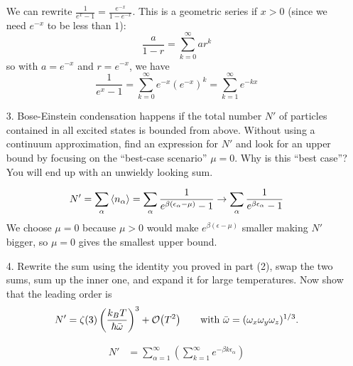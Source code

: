 \documentclass[a4paper,twoside]{article}
\begin{document}
\begin{itemize}
        \begin{problem}
            We can rewrite $ \frac{1}{e^x - 1} = \frac{e^{- x}}{1 - e^{- x}} $. This is a geometric series if $ x > 0 $ (since we need $ e^{- x} $ to be less than $ 1 $):
            \begin{equation}
                \frac{a}{1 - r} = \sum_{k=0}^{\infty} a r^k
            \end{equation}
            so with $ a = e^{- x} $ and $ r = e^{- x} $, we have
            \begin{equation}
                \frac{1}{e^x - 1} = \sum_{k=0}^{\infty} e^{-x} (e^{-x})^k = \sum_{k=1}^{\infty} e^{- kx}
            \end{equation}
        \end{problem}
    \item[3.] Bose-Einstein condensation happens if the total number $ N' $ of particles contained in all excited states is bounded from above. Without using a continuum approximation, find an expression for $ N' $ and look for an upper bound by focusing on the ``best-case scenario'' $ \mu = 0 $. Why is this ``best case''? You will end up with an unwieldy looking sum.
        \begin{problem}
            \begin{equation}
                N' = \sum_{\alpha} \ev{n_{\alpha}} = \sum_{\alpha} \frac{1}{e^{\beta (\epsilon_{\alpha} - \mu)} - 1} \to \sum_{\alpha} \frac{1}{e^{\beta \epsilon_{\alpha}} - 1}
            \end{equation}
            We choose $ \mu = 0 $ because $ \mu > 0 $ would make $ e^{\beta (\epsilon - \mu)} $ smaller making $ N' $ bigger, so $ \mu = 0 $ gives the smallest upper bound.
        \end{problem}
    \item[4.] Rewrite the sum using the identity you proved in part (2), swap the two sums, sum up the inner one, and expand it for large temperatures. Now show that the leading order is
        \begin{equation}
            N' = \zeta(3) \left( \frac{k_B T}{\hbar \bar{\omega}} \right)^3 + \order{T^2} \qquad \text{with } \bar{\omega} = (\omega_x \omega_y \omega_z)^{1/3}.
        \end{equation}
        \begin{problem}
            \begin{align}
                N' &= \sum_{\alpha=1}^{\infty} \left( \sum_{k=1}^{\infty} e^{- \beta k \epsilon_{\alpha}} \right) \\

\end{align}
\end{problem}
\end{itemize}
\end{document}
